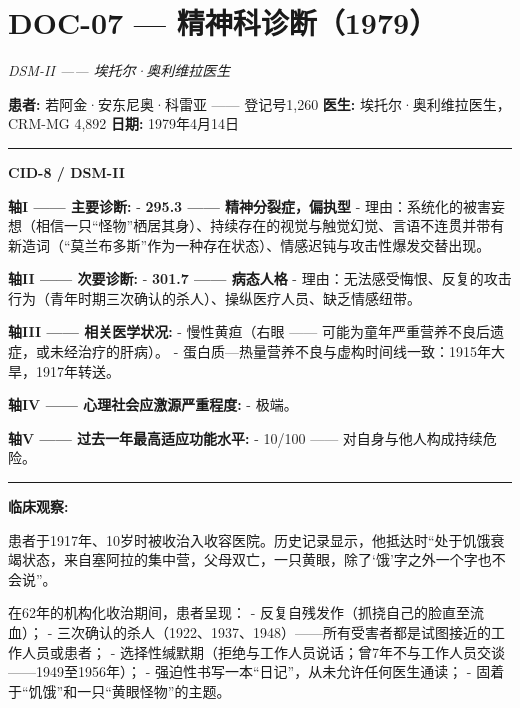 \section*{\textbf{DOC-07} --- 精神科诊断（1979）}

\noindent \textit{DSM-II —— 埃托尔·奥利维拉医生}

\noindent \textbf{患者:} 若阿金·安东尼奥·科雷亚 —— 登记号1,260
\textbf{医生:} 埃托尔·奥利维拉医生，CRM-MG 4,892
\textbf{日期:} 1979年4月14日

\vspace{0.5em}\noindent\rule{\textwidth}{0.5pt}\vspace{0.5em}

\noindent \textbf{CID-8 / DSM-II}

\noindent \textbf{轴I —— 主要诊断:}
- \textbf{295.3 —— 精神分裂症，偏执型}
  - 理由：系统化的被害妄想（相信一只“怪物”栖居其身）、持续存在的视觉与触觉幻觉、言语不连贯并带有新造词（“莫兰布多斯”作为一种存在状态）、情感迟钝与攻击性爆发交替出现。

\noindent \textbf{轴II —— 次要诊断:}
- \textbf{301.7 —— 病态人格}
  - 理由：无法感受悔恨、反复的攻击行为（青年时期三次确认的杀人）、操纵医疗人员、缺乏情感纽带。

\noindent \textbf{轴III —— 相关医学状况:}
- 慢性黄疸（右眼 —— 可能为童年严重营养不良后遗症，或未经治疗的肝病）。
- 蛋白质—热量营养不良与虚构时间线一致：1915年大旱，1917年转送。

\noindent \textbf{轴IV —— 心理社会应激源严重程度:}
- 极端。

\noindent \textbf{轴V —— 过去一年最高适应功能水平:}
- 10/100 —— 对自身与他人构成持续危险。

\vspace{0.5em}\noindent\rule{\textwidth}{0.5pt}\vspace{0.5em}

\noindent \textbf{临床观察:}

\noindent 患者于1917年、10岁时被收治入收容医院。历史记录显示，他抵达时“处于饥饿衰竭状态，来自塞阿拉的集中营，父母双亡，一只黄眼，除了‘饿’字之外一个字也不会说”。

\noindent 在62年的机构化收治期间，患者呈现：
- 反复自残发作（抓挠自己的脸直至流血）；
- 三次确认的杀人（1922、1937、1948）——所有受害者都是试图接近的工作人员或患者；
- 选择性缄默期（拒绝与工作人员说话；曾7年不与工作人员交谈——1949至1956年）；
- 强迫性书写一本“日记”，从未允许任何医生通读；
- 固着于“饥饿”和一只“黄眼怪物”的主题。

